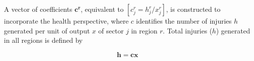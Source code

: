 \documentclass[a4paper,12pt, ]{article}
\begin{document}
A vector of coefficients $\mathbf{c^r}$, equivalent to $[c^r_{j}=h^r_j/x^r_j]$, is constructed to incorporate the health perspective, where $c$ identifies the number of injuries $h$ 
generated per unit of output $x$ of sector $j$ in region $r$. Total injuries ($h$) generated in all regions is defined by

\begin{equation} 
\mathbf{h = cx} 
\label{08}
\end{equation}
\end{document}
